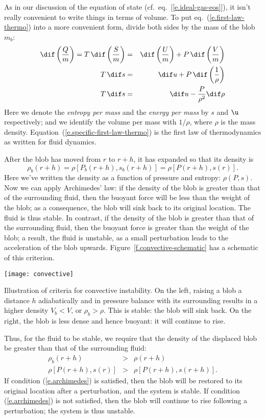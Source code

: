 As in our discussion of the equation of state (cf.\ eq.~[\ref{e.ideal-gas-eos}]), it isn't really convenient to write things in terms of volume. To put eq.~(\ref{e.first-law-thermo}) into a more convenient form, divide both sides by the mass of the blob $m_{b}$:
\begin{eqnarray}
	\dif\left(\frac{Q}{m}\right) = T\,\dif\left(\frac{S}{m}\right) &=&
		\dif\left(\frac{U}{m}\right) + P\,\dif\left(\frac{V}{m}\right)\nonumber\\
	T\,\dif s &=& \dif u + P\,\dif\left(\frac{1}{\rho}\right)\nonumber\\
	T\,\dif s &=& \dif u - \frac{P}{\rho^{2}}\dif\rho \label{e.specific-first-law-thermo}
\end{eqnarray}
Here we denote the \emph{entropy per mass} and the \emph{energy per mass} by $s$ and $\u$ respectively; and we identify the volume per mass with $1/\rho$, where $\rho$ is the mass density. Equation~(\ref{e.specific-first-law-thermo}) is the first law of thermodynamics as written for fluid dynamics.

After the blob has moved from $r$ to $r+h$, it has expanded so that its density is
\[
	\rho_{b}(r+h) = \rho[P_{b}(r+h),s_{b}(r+h)] = \rho[P(r+h),s(r)].
\]
Here we've written the density as a function of pressure and entropy: $\rho(P,s)$. Now we can apply Archimedes' law: if the density of the blob is greater than that of the surrounding fluid, then the buoyant force will be less than the weight of the blob; as a consequence, the blob will sink back to its original location. The fluid is thus stable. In contrast, if the density of the blob is greater than that of the surrounding fluid, then the buoyant force is greater than the weight of the blob; a result, the fluid is unstable, as a small perturbation leads to the acceleration of the blob upwards. Figure~\ref{f.convective-schematic} has a schematic of this criterion.
\begin{marginfigure}
\texttt{[image: convective]}
\caption[Illustration of criteria for convective instability.]{\label{f.convective-schematic}Illustration of criteria for convective instability.  On the left, raising a blob a distance $h$ adiabatically and in pressure balance with its surrounding results in a higher density $V_{b} < V$, or $\rho_{b} > \rho$.  This is stable: the blob will sink back.  On the right, the blob is less dense and hence buoyant: it will continue to rise.}
\end{marginfigure}

Thus, for the fluid to be stable, we require that the density of the displaced blob be greater than that of the surrounding fluid:
\begin{eqnarray}
\rho_{b}(r+h) &>& \rho(r+h) \nonumber\\
\rho[P(r+h),s(r)] &>& \rho[P(r+h),s(r+h)].
\label{e.archimedes}
\end{eqnarray}
If condition (\ref{e.archimedes}) is satisfied, then the blob will be restored to its original location after a perturbation, and the system is stable. If condition (\ref{e.archimedes}) is not satisfied, then the blob will continue to rise following a perturbation; the system is thus unstable.

